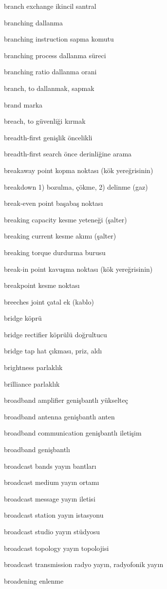 \documentclass[12pt,fleqn]{article}\usepackage{../../common}
\begin{document}
branch exchange ikincil santral

branching dallanma

branching instruction sapma komutu

branching process dallanma süreci

branching ratio dallanma orani

branch, to dallanmak, sapmak

brand marka

breach, to güvenliği kırmak

breadth-first genişlik öncelikli

breadth-first search önce derinliğine arama

breakaway point kopma noktası (kök yereğrisinin)

breakdown 1) bozulma, çökme, 2) delinme (gaz)

break-even point başabaş noktası

breaking capacity kesme yeteneği (şalter)

breaking current kesme akımı (şalter)

breaking torque durdurma burusu

break-in point kavuşma noktası (kök yereğrisinin)

breakpoint kesme noktası

breeches joint çatal ek (kablo)

bridge köprü

bridge rectifier köprülü doğrultucu

bridge tap hat çıkması, priz, aldı

brightness parlaklık

brilliance parlaklık

broadband amplifier genişbantlı yükselteç

broadband antenna genişbantlı anten

broadband communication genişbantlı iletişim

broadband genişbantlı

broadcast bands yayın bantları

broadcast medium yayın ortamı

broadcast message yayın iletisi

broadcast station yayın istasyonu

broadcast studio yayın stüdyosu

broadcast topology yayın topolojisi

broadcast transmission radyo yayın, radyofonik yayın

broadening enlenme
\end{document}
